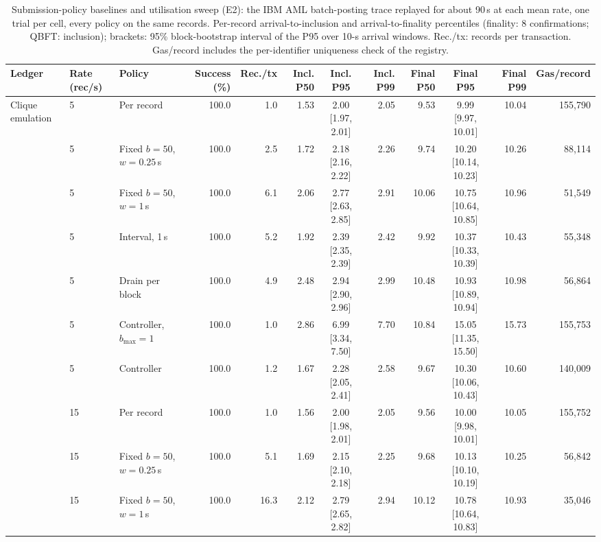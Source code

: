 \begin{table}[t]
\centering
\scriptsize
\caption{Submission-policy baselines and utilisation sweep (E2): the IBM AML batch-posting trace replayed for about 90\,s at each mean rate, one trial per cell, every policy on the same records. Per-record arrival-to-inclusion and arrival-to-finality percentiles (finality: 8 confirmations; QBFT: inclusion); brackets: 95\% block-bootstrap interval of the P95 over 10-s arrival windows. Rec./tx: records per transaction. Gas/record includes the per-identifier uniqueness check of the registry.}
\label{tab:e13}
\begin{adjustbox}{max width=\textwidth}
\begin{tabular}{lllrrrcrrcrr}
\toprule
Ledger & Rate (rec/s) & Policy & Success (\%) & Rec./tx & Incl. P50 & Incl. P95 & Incl. P99 & Final P50 & Final P95 & Final P99 & Gas/record \\
\midrule
Clique emulation & 5 & Per record & 100.0 & 1.0 & 1.53 & 2.00 [1.97, 2.01] & 2.05 & 9.53 & 9.99 [9.97, 10.01] & 10.04 & 155,790 \\
 & 5 & Fixed $b{=}50$, $w{=}0.25$\,s & 100.0 & 2.5 & 1.72 & 2.18 [2.16, 2.22] & 2.26 & 9.74 & 10.20 [10.14, 10.23] & 10.26 & 88,114 \\
 & 5 & Fixed $b{=}50$, $w{=}1$\,s & 100.0 & 6.1 & 2.06 & 2.77 [2.63, 2.85] & 2.91 & 10.06 & 10.75 [10.64, 10.85] & 10.96 & 51,549 \\
 & 5 & Interval, 1\,s & 100.0 & 5.2 & 1.92 & 2.39 [2.35, 2.39] & 2.42 & 9.92 & 10.37 [10.33, 10.39] & 10.43 & 55,348 \\
 & 5 & Drain per block & 100.0 & 4.9 & 2.48 & 2.94 [2.90, 2.96] & 2.99 & 10.48 & 10.93 [10.89, 10.94] & 10.98 & 56,864 \\
 & 5 & Controller, $b_{\max}{=}1$ & 100.0 & 1.0 & 2.86 & 6.99 [3.34, 7.50] & 7.70 & 10.84 & 15.05 [11.35, 15.50] & 15.73 & 155,753 \\
 & 5 & Controller & 100.0 & 1.2 & 1.67 & 2.28 [2.05, 2.41] & 2.58 & 9.67 & 10.30 [10.06, 10.43] & 10.60 & 140,009 \\
 & 15 & Per record & 100.0 & 1.0 & 1.56 & 2.00 [1.98, 2.01] & 2.05 & 9.56 & 10.00 [9.98, 10.01] & 10.05 & 155,752 \\
 & 15 & Fixed $b{=}50$, $w{=}0.25$\,s & 100.0 & 5.1 & 1.69 & 2.15 [2.10, 2.18] & 2.25 & 9.68 & 10.13 [10.10, 10.19] & 10.25 & 56,842 \\
 & 15 & Fixed $b{=}50$, $w{=}1$\,s & 100.0 & 16.3 & 2.12 & 2.79 [2.65, 2.82] & 2.94 & 10.12 & 10.78 [10.64, 10.83] & 10.93 & 35,046 \\

\end{tabular}
\end{adjustbox}
\end{table}
